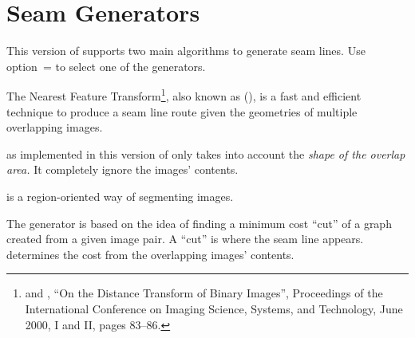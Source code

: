 

\chapter[Seam Generators]{Seam Generators
  \label{sec:seam-generators}
  }

This version of \App{} supports two main algorithms to generate seam
lines.  Use
option~= to select
one of the generators.

\begin{description}
\item[\itempar{Nearest Feature Transform (\acronym{NFT}),
    \metavar{ALGORITHM}=\code{nearest-feature-transform}}]\itemend
  The Nearest
  Feature Transform\footnote{%
    and %
    , ``On
    the Distance Transform of Binary Images'', Proceedings of the
    International Conference on Imaging Science, Systems, and
    Technology, June 2000,  I and II, pages
    83--86.}, also known as
  (), is a
  fast and efficient technique to produce a seam line route given the
  geometries of multiple overlapping images.

   as implemented in this version of \App{} only takes
  into account the \emph{shape of the overlap area.}  It completely
  ignore the images' contents.

\item[\itempar{Graph-Cut (\acronym{GC}),
    \metavar{ALGORITHM}=\code{graph-cut}}]\itemend
   is a region-oriented way of
  segmenting images.

  The generator is based on the idea of finding a minimum cost ``cut''
  of a graph created from a given image pair.  A ``cut'' is where the
  seam line appears.   determines the cost from the
  overlapping images' contents.
\end{description}

